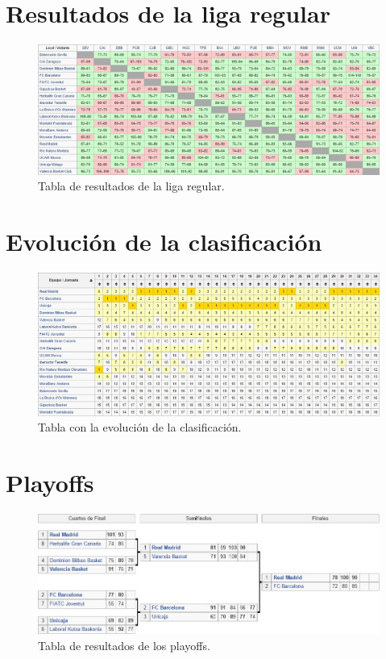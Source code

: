 \section*{Resultados de la liga regular}

\begin{figure}[H]
	\includegraphics[scale=0.6]{images/resultados.jpg}
	\caption{Tabla de resultados de la liga regular.} 
\end{figure}

\section*{Evolución de la clasificación}

\begin{figure}[H]
	\includegraphics[scale=0.6]{images/evolucion.jpg}
	\caption{Tabla con la evolución de la clasificación.} 
\end{figure}

\section*{Playoffs}

\begin{figure}[H]
	\includegraphics[scale=0.7]{images/playoffs.jpg}
	\caption{Tabla de resultados de los playoffs.} 
\end{figure}

